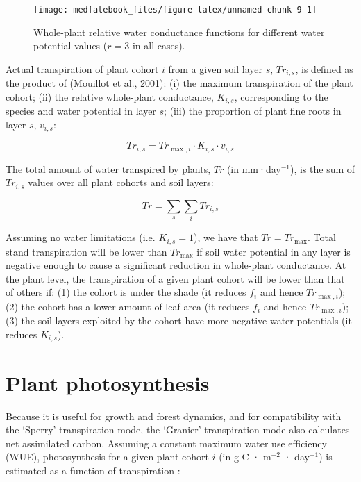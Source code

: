 \documentclass[]{book}
\begin{document}
\begin{figure}

{\centering \texttt{[image: medfatebook\_files/figure-latex/unnamed-chunk-9-1]} 

}

\caption{Whole-plant relative water conductance functions for different water potential values ($r = 3$ in all cases).}\label{fig:unnamed-chunk-9}
\end{figure}

Actual transpiration of plant cohort \(i\) from a given soil layer
\(s\), \(Tr_{i,s}\), is defined as the product of (Mouillot et al.,
2001): (i) the maximum transpiration of the plant cohort; (ii) the
relative whole-plant conductance, \(K_{i,s}\), corresponding to the
species and water potential in layer \(s\); (iii) the proportion of
plant fine roots in layer \(s\), \(v_{i,s}\):

\begin{equation}
Tr_{i,s} =  Tr_{\max,i} \cdot K_{i,s} \cdot v_{i,s}
\end{equation}

The total amount of water transpired by plants, \(Tr\) (in
mm·day\(^{-1}\)), is the sum of \(Tr_{i,s}\) values over all plant
cohorts and soil layers:

\begin{equation}
Tr =\sum_{s}\sum_{i}{Tr_{i,s}}
\end{equation}

Assuming no water limitations (i.e. \(K_{i,s} = 1\)), we have that
\(Tr = Tr_{\max}\). Total stand transpiration will be lower than
\(Tr_{\max}\) if soil water potential in any layer is negative enough to
cause a significant reduction in whole-plant conductance. At the plant
level, the transpiration of a given plant cohort will be lower than that
of others if: (1) the cohort is under the shade (it reduces \(f_i\) and
hence \(Tr_{\max,i}\)); (2) the cohort has a lower amount of leaf area
(it reduces \(f_i\) and hence \(Tr_{\max,i}\)); (3) the soil layers
exploited by the cohort have more negative water potentials (it reduces
\(K_{i,s}\)).

\section{Plant photosynthesis}\label{plant-photosynthesis}

Because it is useful for growth and forest dynamics, and for
compatibility with the `Sperry' transpiration mode, the `Granier'
transpiration mode also calculates net assimilated carbon. Assuming a
constant maximum water use efficiency (WUE), photosynthesis for a given
plant cohort \(i\) (in g C · m\(^{-2}\) · day\(^{-1}\)) is estimated as
a function of transpiration \citep{Mouillot2001}:
\end{document}
